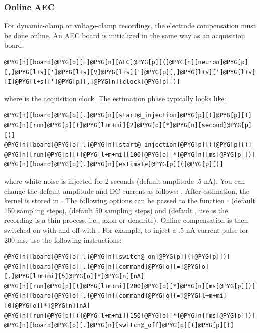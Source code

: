\documentclass[letterpaper,10pt,english]{manual}
\begin{document}
\subsubsection{Online AEC}

For dynamic-clamp or voltage-clamp recordings, the electrode compensation must be
done online. An AEC board is initialized in the same way as an acquisition board:

\begin{Verbatim}[commandchars=@\[\]]
@PYG[n][board]@PYG[o][=]@PYG[n][AEC]@PYG[p][(]@PYG[n][neuron]@PYG[p][,]@PYG[l+s][']@PYG[l+s][V]@PYG[l+s][']@PYG[p][,]@PYG[l+s][']@PYG[l+s][I]@PYG[l+s][']@PYG[p][,]@PYG[n][clock]@PYG[p][)]
\end{Verbatim}

where  is the acquisition clock. The estimation phase typically looks like:

\begin{Verbatim}[commandchars=@\[\]]
@PYG[n][board]@PYG[o][.]@PYG[n][start@_injection]@PYG[p][(]@PYG[p][)]
@PYG[n][run]@PYG[p][(]@PYG[l+m+mi][2]@PYG[o][*]@PYG[n][second]@PYG[p][)]
@PYG[n][board]@PYG[o][.]@PYG[n][start@_injection]@PYG[p][(]@PYG[p][)]
@PYG[n][run]@PYG[p][(]@PYG[l+m+mi][100]@PYG[o][*]@PYG[n][ms]@PYG[p][)]
@PYG[n][board]@PYG[o][.]@PYG[n][estimate]@PYG[p][(]@PYG[p][)]
\end{Verbatim}

where white noise is injected for 2 seconds (default amplitude .5 nA).
You can change the default amplitude and DC current as follows:
.
After estimation, the kernel is stored in .
The following options can be passed to the function :
 (default 150 sampling steps),  (default 50 sampling steps)
and  (default , use  is the recording is a thin
process, i.e., axon or dendrite).
Online compensation is then switched on with 
and off with . For example, to inject a .5 nA current
pulse for 200 ms, use the following instructions:

\begin{Verbatim}[commandchars=@\[\]]
@PYG[n][board]@PYG[o][.]@PYG[n][switch@_on]@PYG[p][(]@PYG[p][)]
@PYG[n][board]@PYG[o][.]@PYG[n][command]@PYG[o][=]@PYG[o][.]@PYG[l+m+mi][5]@PYG[o][*]@PYG[n][nA]
@PYG[n][run]@PYG[p][(]@PYG[l+m+mi][200]@PYG[o][*]@PYG[n][ms]@PYG[p][)]
@PYG[n][board]@PYG[o][.]@PYG[n][command]@PYG[o][=]@PYG[l+m+mi][0]@PYG[o][*]@PYG[n][nA]
@PYG[n][run]@PYG[p][(]@PYG[l+m+mi][150]@PYG[o][*]@PYG[n][ms]@PYG[p][)]
@PYG[n][board]@PYG[o][.]@PYG[n][switch@_off]@PYG[p][(]@PYG[p][)]
\end{Verbatim}
\end{document}
